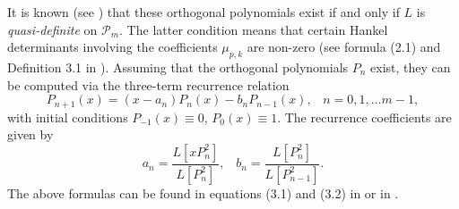 \documentclass[12pt]{article}
\theoremstyle{definition}
\begin{document}
It is known (see \cite[Theorem 3.2]{Pozza2016}) that these orthogonal polynomials exist if and only if $L$ is {\it quasi-definite} on ${{\mathscr P}}_m$. The latter condition means that certain Hankel determinants involving the coefficients $\mu_{p,k}$ are non-zero (see formula (2.1) and Definition 3.1 in \cite{Pozza2016}). Assuming that the orthogonal polynomials $P_n$ exist, they can be computed   via the three-term recurrence relation 
\begin{equation}\label{three_term_recurrence}
 P_{n+1}(x)=(x-a_n) P_n(x) - b_n P_{n-1}(x), \;\;\; n=0,1,\dots m-1, 
\end{equation}
 with initial conditions $P_{-1}(x)\equiv 0$, $P_0(x) \equiv 1$. The  recurrence  coefficients  are given by
 $$
 a_n = \frac{L[ x P_n^2]}{L[P_n^2]}, \;\;\; b_n=\frac{L[ P_n^2]}{L[P_{n-1}^2]}. 
 $$
 The above formulas can be found in equations (3.1) and (3.2) in \cite{Pozza2016} or in \cite[Theorem 2.9]{MARCELLAN2001}. 
\end{document}
